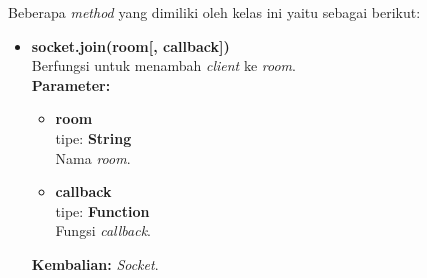 \begin{enumerate}
	Beberapa \textit{method} yang dimiliki oleh kelas ini yaitu sebagai berikut:
	\begin{itemize}
		\item \textbf{socket.join(room[, callback])} \\
		Berfungsi untuk menambah \textit{client} ke \textit{room}. \\
		\textbf{Parameter:}
		\begin{itemize}
			\item \textbf{room} \\tipe: \textbf{String} \\ Nama \textit{room}.
			\item \textbf{callback} \\tipe: \textbf{Function} \\ Fungsi \textit{callback}.
		\end{itemize}
		\textbf{Kembalian:} \textit{Socket}.
		
%		
		
		
	\end{itemize}
	

\end{enumerate}
